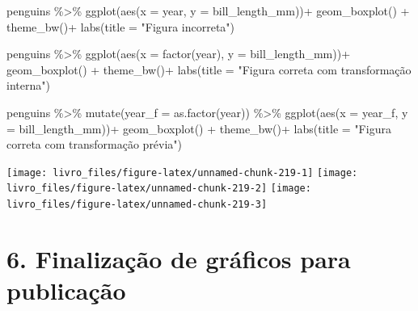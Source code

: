 \documentclass[
]{book}
\newenvironment{Shaded}{\begin{snugshade}}{\end{snugshade}}
\newcommand{\AttributeTok}[1]{\textcolor[rgb]{0.61,0.61,0.61}{#1}}
\newcommand{\FunctionTok}[1]{\textcolor[rgb]{0,0,0}{#1}}
\newcommand{\NormalTok}[1]{#1}
\newcommand{\SpecialCharTok}[1]{\textcolor[rgb]{0,0,0}{#1}}
\newcommand{\StringTok}[1]{\textcolor[rgb]{0.5,0.5,0.5}{#1}}
\begin{document}
\begin{Shaded}
\begin{Highlighting}[]
\NormalTok{penguins }\SpecialCharTok{\%\textgreater{}\%}
  \FunctionTok{ggplot}\NormalTok{(}\FunctionTok{aes}\NormalTok{(}\AttributeTok{x =}\NormalTok{ year, }\AttributeTok{y =}\NormalTok{ bill\_length\_mm))}\SpecialCharTok{+}
  \FunctionTok{geom\_boxplot}\NormalTok{() }\SpecialCharTok{+} 
  \FunctionTok{theme\_bw}\NormalTok{()}\SpecialCharTok{+}
  \FunctionTok{labs}\NormalTok{(}\AttributeTok{title =} \StringTok{"Figura incorreta"}\NormalTok{)}

\NormalTok{penguins }\SpecialCharTok{\%\textgreater{}\%}
  \FunctionTok{ggplot}\NormalTok{(}\FunctionTok{aes}\NormalTok{(}\AttributeTok{x =} \FunctionTok{factor}\NormalTok{(year), }\AttributeTok{y =}\NormalTok{ bill\_length\_mm))}\SpecialCharTok{+}
  \FunctionTok{geom\_boxplot}\NormalTok{() }\SpecialCharTok{+} 
  \FunctionTok{theme\_bw}\NormalTok{()}\SpecialCharTok{+}
  \FunctionTok{labs}\NormalTok{(}\AttributeTok{title =} \StringTok{"Figura correta com transformação interna"}\NormalTok{)}

\NormalTok{penguins }\SpecialCharTok{\%\textgreater{}\%}
  \FunctionTok{mutate}\NormalTok{(}\AttributeTok{year\_f =} \FunctionTok{as.factor}\NormalTok{(year)) }\SpecialCharTok{\%\textgreater{}\%} 
  \FunctionTok{ggplot}\NormalTok{(}\FunctionTok{aes}\NormalTok{(}\AttributeTok{x =}\NormalTok{ year\_f, }\AttributeTok{y =}\NormalTok{ bill\_length\_mm))}\SpecialCharTok{+}
  \FunctionTok{geom\_boxplot}\NormalTok{() }\SpecialCharTok{+} 
  \FunctionTok{theme\_bw}\NormalTok{()}\SpecialCharTok{+}
  \FunctionTok{labs}\NormalTok{(}\AttributeTok{title =} \StringTok{"Figura correta com transformação prévia"}\NormalTok{)}
\end{Highlighting}
\end{Shaded}

\begin{center}\texttt{[image: livro\_files/figure-latex/unnamed-chunk-219-1]} \texttt{[image: livro\_files/figure-latex/unnamed-chunk-219-2]} \texttt{[image: livro\_files/figure-latex/unnamed-chunk-219-3]} \end{center}

\hypertarget{finalizauxe7uxe3o-de-gruxe1ficos-para-publicauxe7uxe3o}{%
\section{6. Finalização de gráficos para publicação}\label{finalizauxe7uxe3o-de-gruxe1ficos-para-publicauxe7uxe3o}}
\end{document}
